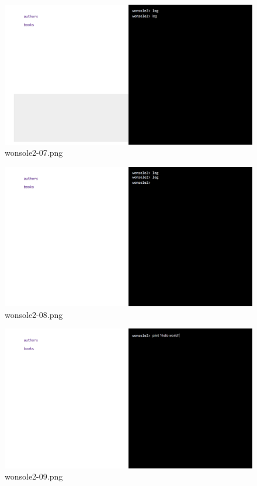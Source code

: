 \clearpage
\begin{figure}
\includegraphics[width=\textwidth]{screenshot/wonsole2/wonsole2-07.png}
\caption{wonsole2-07.png}
\label{wonsole2-07.png}
\end{figure}


\begin{figure}
\includegraphics[width=\textwidth]{screenshot/wonsole2/wonsole2-08.png}
\caption{wonsole2-08.png}
\label{wonsole2-08.png}
\end{figure}


\clearpage
\begin{figure}
\includegraphics[width=\textwidth]{screenshot/wonsole2/wonsole2-09.png}
\caption{wonsole2-09.png}
\label{wonsole2-09.png}
\end{figure}


